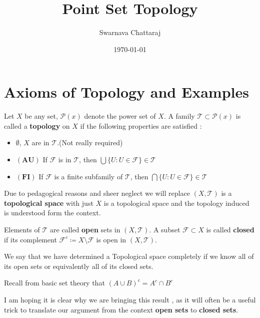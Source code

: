 \documentclass{scrartcl} %
\title{Point Set Topology}
\author{Swarnava Chattaraj}
\date{\today}
\newcommand{\Tau}{\mathcal{T}}
\newcommand{\sP}{\mathcal{P}}
\newcommand{\sF}{\mathcal{F}}
\begin{document}
\maketitle
\section{Axioms of Topology and Examples}
Let $X$ be any set, $\sP(x)$ denote the power
set of $X$. A family $\Tau \subset \sP(x)$ is called a
\textbf{topology} on $X$ if the following properties are
satisfied :
\begin{itemize}
	\item $\emptyset$, $X$ are in $\Tau$.(Not really
		required)
	\item $\left(\textbf{AU}\right)$
		If $\sF$ is in $\Tau$, then
		$\bigcup \{U : U \in \sF \} \in \Tau$
	\item $\left(\textbf{FI}\right)$ If $\sF$ is a
		finite subfamily of $\Tau$, then 
	 	$\bigcap \{U : U \in \sF \} \in \Tau$
\end{itemize}
Due to pedagogical reasons and sheer neglect we will
replace $\left(X, \Tau \right)$ is a\\ 
\textbf{topological space} with just $X$ is a topological space and the topology induced is understood form the 
context.
\begin{definition}
	Elements of $\Tau$ are called \textbf{open} 
	sets in $\left(X, \Tau\right)$. A subset 
	$\sF \subset X$ is called \textbf{closed} if
	its complement $\sF^c \coloneq X\setminus\sF$
	is open in $\left(X, \Tau\right)$.
\end{definition}
\begin{remark}
We say that we have determined a Topological space 
completely if we know all of its open sets or 
equivalently all of its closed sets.
\end{remark}
\begin{lemma}
Recall from basic set theory that $\left(A \cup B\right)
^c = A^c \cap B^c$
\end{lemma}
I am hoping it is clear why we are bringing this result
, as it will often be a useful trick to translate our 
argument from the context \textbf{open sets} to
\textbf{closed sets}.
\end{document}

